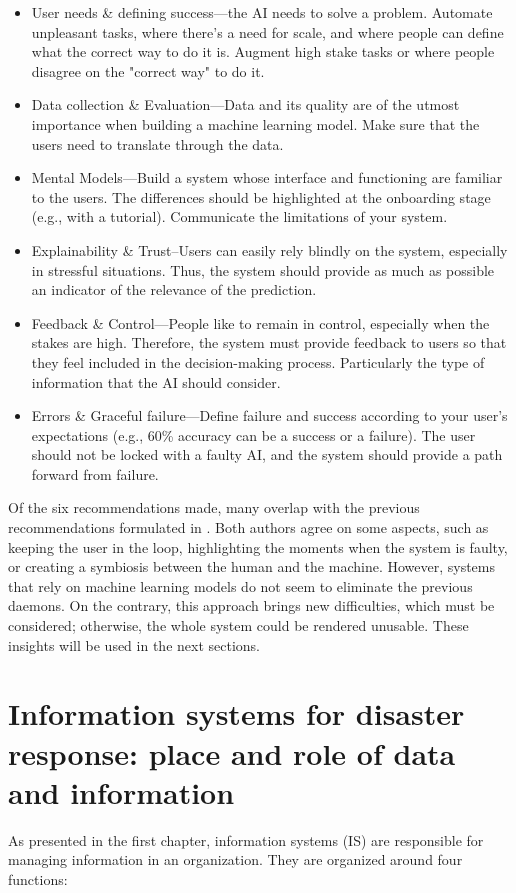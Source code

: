 \begin{itemize}
    \item User needs \& defining success—the AI needs to solve a problem.
          Automate unpleasant tasks, where there's a need for scale, and where people can define what the correct way to do it is.
          Augment high stake tasks or where people disagree on the "correct way" to do it.
    \item Data collection \& Evaluation—Data and its quality are of the utmost importance when building a machine learning model.
          Make sure that the users need to translate through the data.
    \item Mental Models—Build a system whose interface and functioning are familiar to the users.
          The differences should be highlighted at the onboarding stage (e.g., with a tutorial).
          Communicate the limitations of your system.
    \item Explainability \& Trust–Users can easily rely blindly on the system, especially in stressful situations.
          Thus, the system should provide as much as possible an indicator of the relevance of the prediction.
    \item Feedback \& Control—People like to remain in control, especially when the stakes are high.
          Therefore, the system must provide feedback to users so that they feel included in the decision-making process.
          Particularly the type of information that the AI should consider.
    \item Errors \& Graceful failure—Define failure and success according to your user's expectations (e.g., 60\% accuracy can be a success or a failure).
          The user should not be locked with a faulty AI, and the system should provide a path forward from failure.
\end{itemize}

Of the six recommendations made, many overlap with the previous recommendations formulated in \textcite{endsleyDesigningSituationAwareness2016}.
Both authors agree on some aspects, such as keeping the user in the loop, highlighting the moments when the system is faulty, or creating a symbiosis between the human and the machine.
However, systems that rely on machine learning models do not seem to eliminate the previous daemons.
On the contrary, this approach brings new difficulties, which must be considered; otherwise, the whole system could be rendered unusable.
These insights will be used in the next sections.

\section{Information systems for disaster response: place and role of data and information}
As presented in the first chapter, information systems (IS) are responsible for managing information in an organization.
They are organized around four functions:

